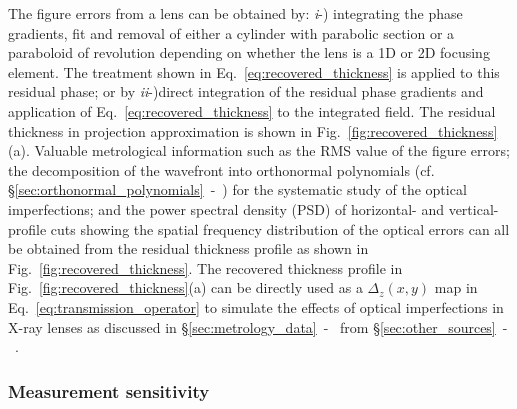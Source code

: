 \begin{refsection}
The figure errors from a lens can be obtained by: \textit{i}-) integrating the phase gradients, fit and removal of either a cylinder with parabolic section or a paraboloid of revolution depending on whether the lens is a 1D or 2D focusing element. The treatment shown in Eq.~\ref{eq:recovered_thickness} is applied to this residual phase; or by \textit{ii}-)direct integration of the residual phase gradients and application of Eq.~\ref{eq:recovered_thickness} to the integrated field. The residual thickness in projection approximation is shown in Fig.~\ref{fig:recovered_thickness}(a). Valuable metrological information such as the RMS value of the figure errors; the decomposition of the wavefront into orthonormal polynomials (cf. \S\ref{sec:orthonormal_polynomials}~-~\textit{}) for the systematic study of the optical imperfections; and the power spectral density (PSD) of horizontal- and vertical- profile cuts showing the spatial frequency distribution of the optical errors can all be obtained from the residual thickness profile as shown in Fig.~\ref{fig:recovered_thickness}. The recovered thickness profile in Fig.~\ref{fig:recovered_thickness}(a) can be directly used as a $\Delta_z(x,y)$ map in Eq.~\ref{eq:transmission_operator} to simulate the effects of optical imperfections in X-ray lenses as discussed in \S\ref{sec:metrology_data}~-~\textit{} from \S\ref{sec:other_sources}~-~\textit{}. 


\subsubsection*{Measurement sensitivity}


\end{refsection}
